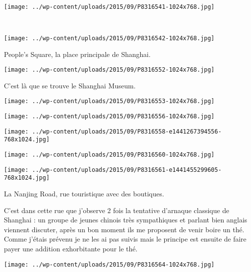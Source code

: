 ~
\begin{center} \texttt{[image: ../wp-content/uploads/2015/09/P8316541-1024x768.jpg]} \end{center}
~
\begin{center} \texttt{[image: ../wp-content/uploads/2015/09/P8316542-1024x768.jpg]} \end{center}
\vspace{-\topsep}
\pagebreak

 People's Square, la place principale de Shanghai. 
\begin{center} \texttt{[image: ../wp-content/uploads/2015/09/P8316552-1024x768.jpg]} \end{center}

 C'est là que se trouve le Shanghai Museum.
\begin{center} \texttt{[image: ../wp-content/uploads/2015/09/P8316553-1024x768.jpg]} \end{center}
\begin{center} \texttt{[image: ../wp-content/uploads/2015/09/P8316556-1024x768.jpg]} \end{center}
\begin{center} \texttt{[image: ../wp-content/uploads/2015/09/P8316558-e1441267394556-768x1024.jpg]} \end{center}
\begin{center} \texttt{[image: ../wp-content/uploads/2015/09/P8316560-1024x768.jpg]} \end{center}
\begin{center} \texttt{[image: ../wp-content/uploads/2015/09/P8316561-e1441455299605-768x1024.jpg]} \end{center}
\vspace{-\topsep}
\vspace{-2.5mm}
\pagebreak

  La Nanjing Road, rue touristique avec des boutiques. 

 C'est dans cette rue que j'observe 2 fois la tentative d'arnaque classique de Shanghai : un groupe de jeunes chinois très sympathiques et parlant bien anglais viennent discuter, après un bon moment ils me proposent de venir boire un thé. Comme j'étais prévenu je ne les ai pas suivis mais le principe est ensuite de faire payer une addition exhorbitante pour le thé. 
\begin{center} \texttt{[image: ../wp-content/uploads/2015/09/P8316564-1024x768.jpg]} \end{center}

